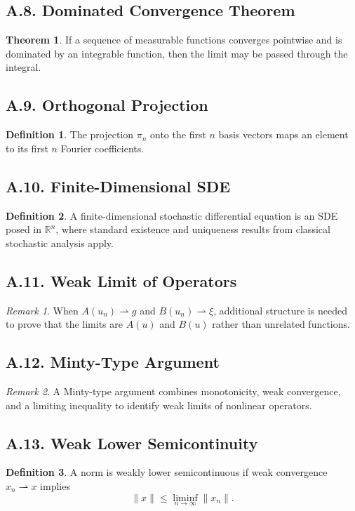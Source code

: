 \documentclass[11pt]{article}
\theoremstyle{definition}
\newtheorem{definition}{Definition}
\newtheorem{theorem}{Theorem}
\theoremstyle{remark}
\newtheorem{remark}{Remark}
\begin{document}
\subsection*{A.8. Dominated Convergence Theorem}
\begin{theorem}
If a sequence of measurable functions converges pointwise and is dominated by an integrable function, then the limit may be passed through the integral.
\end{theorem}

\subsection*{A.9. Orthogonal Projection}
\begin{definition}
The projection \(\pi_n\) onto the first \(n\) basis vectors maps an element to its first \(n\) Fourier coefficients.
\end{definition}

\subsection*{A.10. Finite-Dimensional SDE}
\begin{definition}
A finite-dimensional stochastic differential equation is an SDE posed in \(\mathbb R^n\), where standard existence and uniqueness results from classical stochastic analysis apply.
\end{definition}

\subsection*{A.11. Weak Limit of Operators}
\begin{remark}
When \(A(u_n)\rightharpoonup g\) and \(B(u_n)\rightharpoonup \xi\), additional structure is needed to prove that the limits are \(A(u)\) and \(B(u)\) rather than unrelated functions.
\end{remark}

\subsection*{A.12. Minty-Type Argument}
\begin{remark}
A Minty-type argument combines monotonicity, weak convergence, and a limiting inequality to identify weak limits of nonlinear operators.
\end{remark}

\subsection*{A.13. Weak Lower Semicontinuity}
\begin{definition}
A norm is weakly lower semicontinuous if weak convergence \(x_n\rightharpoonup x\) implies
\[
\|x\|\le \liminf_{n\to\infty}\|x_n\|.
\]
\end{definition}
\end{document}
